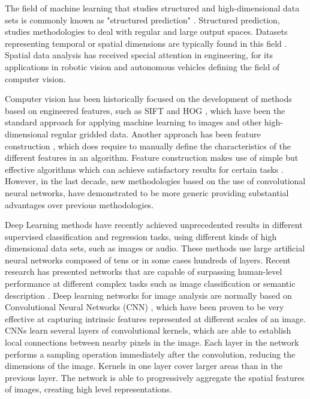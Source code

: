 The field of machine learning that studies structured and high-dimensional data sets is commonly known as "structured prediction" \citep{taskar2005learning}. Structured prediction, studies methodologies to deal with regular and large output spaces. Datasets representing temporal or spatial dimensions are typically found in this field \citep{gupta2010estimating,tran2012max}. Spatial data analysis has received special attention in engineering, for its applications in robotic vision and autonomous vehicles defining the field of computer vision.

\medskip

Computer vision has been historically focused on the development of methods based on engineered features, such as SIFT \citep{lowe2004distinctive} and HOG \citep{dalal2005histograms}, which have been the standard approach for applying machine learning to images and other high-dimensional regular gridded data. Another approach has been feature construction \citep{guyon2006introduction}, which does require to manually define the characteristics of the different features in an algorithm. Feature construction makes use of simple but effective algorithms which can achieve satisfactory results for certain tasks \citep{blum1997selection}. However, in the last decade, new methodologies based on the use of convolutional neural networks, have demonstrated to be more generic providing substantial advantages over previous methodologies. 

\medskip

Deep Learning \citep{lecun2015deep} methods have recently achieved unprecedented results in different supervised classification and regression tasks, using different kinds of high dimensional data sets, such as images or audio. These methods use large artificial neural networks composed of tens or in some cases hundreds of layers. Recent research has presented networks that are capable of surpassing human-level performance at different complex tasks such as image classification \citep{krizhevsky2012imagenet} or semantic description \citep{karpathy2015deep}. Deep learning networks for image analysis are normally based on Convolutional Neural Networks (CNN) \citep{krizhevsky2012imagenet}, which have been proven to be very effective at capturing intrinsic features represented at different scales of an image. CNNs learn several layers of convolutional kernels, which are able to establish local connections between nearby pixels in the image. Each layer in the network performs a sampling operation immediately after the convolution, reducing the dimensions of the image. Kernels in one layer cover larger areas than in the previous layer. The network is able to progressively aggregate the spatial features of images, creating high level representations.

